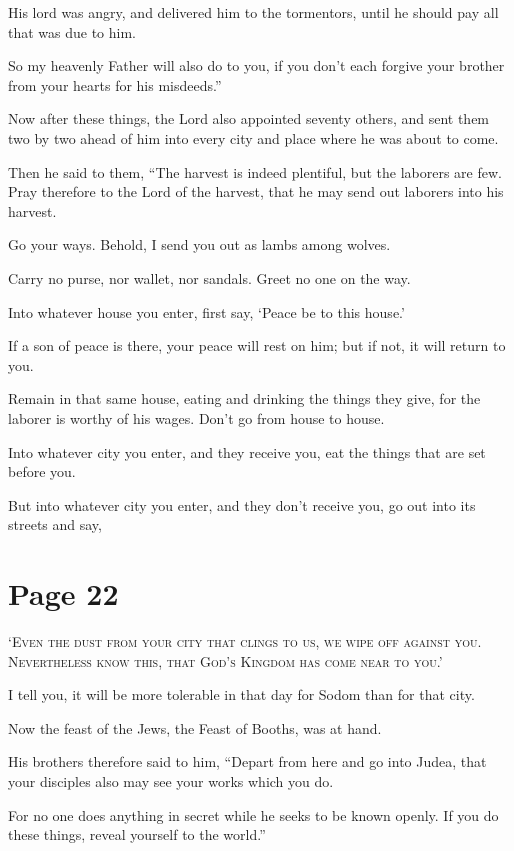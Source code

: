 His lord was angry, and delivered him to the tormentors, until he should pay all that was due to him.

So my heavenly Father will also do to you, if you don’t each forgive your brother from your hearts for his misdeeds.”

Now after these things, the Lord also appointed seventy others, and sent them two by two ahead of him into every city and place where he was about to come.

Then he said to them, “The harvest is indeed plentiful, but the laborers are few. Pray therefore to the Lord of the harvest, that he may send out laborers into his harvest.

Go your ways. Behold, I send you out as lambs among wolves.

Carry no purse, nor wallet, nor sandals. Greet no one on the way.

Into whatever house you enter, first say, ‘Peace be to this house.’

If a son of peace is there, your peace will rest on him; but if not, it will return to you.

Remain in that same house, eating and drinking the things they give, for the laborer is worthy of his wages. Don’t go from house to house.

Into whatever city you enter, and they receive you, eat the things that are set before you.

But into whatever city you enter, and they don’t receive you, go out into its streets and say,



\chapterornament
\section*{Page 22}

\lettrine{‘}{Even the dust from your city that clings to us, we wipe off against you. Nevertheless know this, that God’s Kingdom has come near to you.’}

I tell you, it will be more tolerable in that day for Sodom than for that city.

Now the feast of the Jews, the Feast of Booths, was at hand.

His brothers therefore said to him, “Depart from here and go into Judea, that your disciples also may see your works which you do.

For no one does anything in secret while he seeks to be known openly. If you do these things, reveal yourself to the world.”

